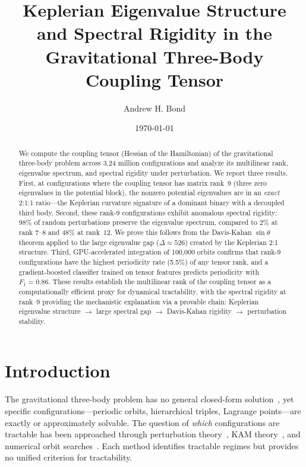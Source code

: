 \documentclass[aps,pre,twocolumn,superscriptaddress,floatfix]{revtex4-2}
\begin{document}
\title{Keplerian Eigenvalue Structure and Spectral Rigidity in the\\Gravitational Three-Body Coupling Tensor}

\author{Andrew H. Bond}

\date{\today}

\begin{abstract}
We compute the coupling tensor (Hessian of the Hamiltonian) of the
gravitational three-body problem across 3.24 million configurations
and analyze its multilinear rank, eigenvalue spectrum, and spectral
rigidity under perturbation. We report three results.
First, at configurations where the coupling tensor has matrix rank~9
(three zero eigenvalues in the potential block), the nonzero potential
eigenvalues are in an \emph{exact} 2:1:1 ratio---the Keplerian curvature
signature of a dominant binary with a decoupled third body.
Second, these rank-9 configurations exhibit anomalous spectral rigidity:
98\% of random perturbations preserve the eigenvalue spectrum, compared
to 2\% at rank 7--8 and 48\% at rank~12. We prove this follows from
the Davis-Kahan $\sin\theta$ theorem applied to the large eigenvalue
gap ($\Delta \approx 526$) created by the Keplerian 2:1 structure.
Third, GPU-accelerated integration of 100,000 orbits confirms that
rank-9 configurations have the highest periodicity rate (5.5\%) of any
tensor rank, and a gradient-boosted classifier trained on tensor
features predicts periodicity with $F_1 = 0.86$.
These results establish the multilinear rank of the coupling tensor
as a computationally efficient proxy for dynamical tractability,
with the spectral rigidity at rank~9 providing the mechanistic
explanation via a provable chain: Keplerian eigenvalue structure
$\to$ large spectral gap $\to$ Davis-Kahan rigidity $\to$
perturbation stability.
\end{abstract}

\maketitle

\section{Introduction}

The gravitational three-body problem has no general closed-form
solution~\cite{poincare1892}, yet specific configurations---periodic
orbits, hierarchical triples, Lagrange points---are exactly or
approximately solvable. The question of \emph{which} configurations
are tractable has been approached through perturbation
theory~\cite{murray1999solar}, KAM theory~\cite{arnold1963small},
and numerical orbit searches~\cite{suvakov2013three}. Each method
identifies tractable regimes but provides no unified criterion for
tractability.
\end{document}
